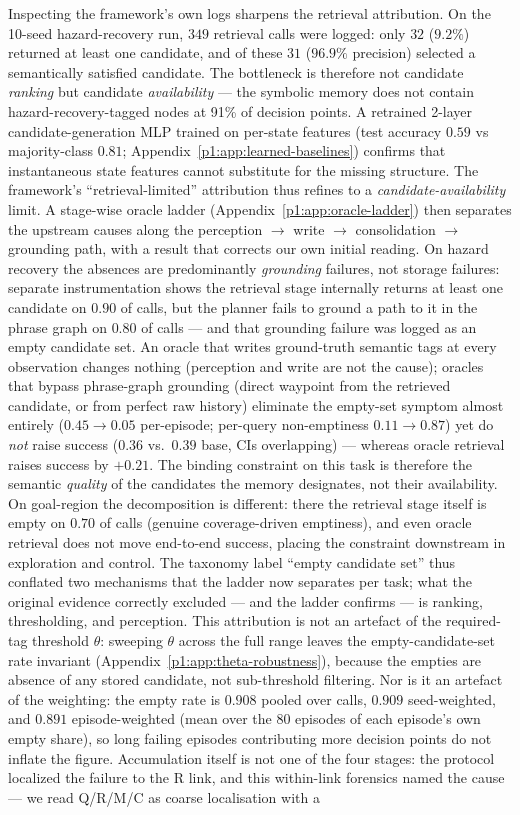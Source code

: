 \documentclass{article}
\begin{document}
Inspecting the framework's own logs sharpens the retrieval attribution. On the 10-seed hazard-recovery run, $349$ retrieval calls were logged: only $32$ ($9.2\%$) returned at least one candidate, and of these $31$ ($96.9\%$ precision) selected a semantically satisfied candidate. The bottleneck is therefore not candidate \emph{ranking} but candidate \emph{availability} --- the symbolic memory does not contain hazard-recovery-tagged nodes at 91\% of decision points. A retrained 2-layer candidate-generation MLP trained on per-state features (test accuracy $0.59$ vs majority-class $0.81$; Appendix~\ref{p1:app:learned-baselines}) confirms that instantaneous state features cannot substitute for the missing structure. The framework's ``retrieval-limited'' attribution thus refines to a \emph{candidate-availability} limit. A stage-wise oracle ladder (Appendix~\ref{p1:app:oracle-ladder}) then separates the upstream causes along the perception $\to$ write $\to$ consolidation $\to$ grounding path, with a result that corrects our own initial reading. On hazard recovery the absences are predominantly \emph{grounding} failures, not storage failures: separate instrumentation shows the retrieval stage internally returns at least one candidate on $0.90$ of calls, but the planner fails to ground a path to it in the phrase graph on $0.80$ of calls --- and that grounding failure was logged as an empty candidate set. An oracle that writes ground-truth semantic tags at every observation changes nothing (perception and write are not the cause); oracles that bypass phrase-graph grounding (direct waypoint from the retrieved candidate, or from perfect raw history) eliminate the empty-set symptom almost entirely ($0.45 \to 0.05$ per-episode; per-query non-emptiness $0.11 \to 0.87$) yet do \emph{not} raise success ($0.36$ vs.\ $0.39$ base, CIs overlapping) --- whereas oracle retrieval raises success by $+0.21$. The binding constraint on this task is therefore the semantic \emph{quality} of the candidates the memory designates, not their availability. On goal-region the decomposition is different: there the retrieval stage itself is empty on $0.70$ of calls (genuine coverage-driven emptiness), and even oracle retrieval does not move end-to-end success, placing the constraint downstream in exploration and control. The taxonomy label ``empty candidate set'' thus conflated two mechanisms that the ladder now separates per task; what the original evidence correctly excluded --- and the ladder confirms --- is ranking, thresholding, and perception. This attribution is not an artefact of the required-tag threshold $\theta$: sweeping $\theta$ across the full range leaves the empty-candidate-set rate invariant (Appendix~\ref{p1:app:theta-robustness}), because the empties are absence of any stored candidate, not sub-threshold filtering. Nor is it an artefact of the weighting: the empty rate is $0.908$ pooled over calls, $0.909$ seed-weighted, and $0.891$ episode-weighted (mean over the 80 episodes of each episode's own empty share), so long failing episodes contributing more decision points do not inflate the figure. Accumulation itself is not one of the four stages: the protocol localized the failure to the R link, and this within-link forensics named the cause --- we read Q/R/M/C as coarse localisation with a 
\end{document}
